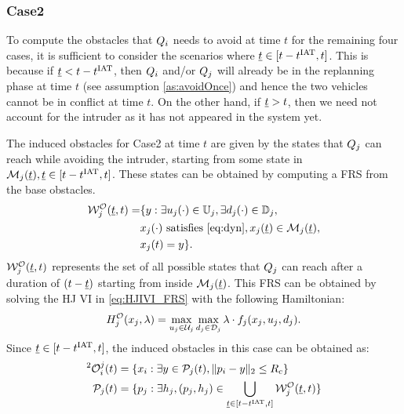 \subsubsection{Case2} \label{sec:intruderObs_case2}
To compute the obstacles that $Q_i$ needs to avoid at time $t$ for the remaining four cases, it is sufficient to consider the scenarios where $\underline{t} \in [t-t^\text{IAT}, t]$. This is because if $\underline{t} < t - t^\text{IAT}$, then $Q_i$ and/or $Q_j$ will already be in the replanning phase at time $t$ (see assumption \ref{as:avoidOnce}) and hence the two vehicles cannot be in conflict at time $t$. On the other hand, if $\underline{t} > t$, then we need not account for the intruder as it has not appeared in the system yet. %

The induced obstacles for Case2 at time $t$ are given by the states that $Q_j$ can reach while avoiding the intruder, starting from some state in $\mathcal{M}_j(\underline{t}), \underline{t} \in [t-t^\text{IAT}, t]$. These states can be obtained by computing a FRS from the base obstacles.
\begin{equation} \label{eq:ObsFRS_case2}
\begin{aligned}
\frs_{j}^{\mathcal{O}}(\tsa, t) = & \{y: \exists \ctrl_j(\cdot) \in \cfset_j, \exists \dstb_j(\cdot) \in \dfset_j, \\
& \state_j(\cdot) \text{ satisfies \eqref{eq:dyn}}, \state_j(\tsa) \in \boset_j(\tsa), \\
& \state_j(t) = y\}.
\end{aligned}
\end{equation}
$\mathcal{W}_{j}^{\mathcal{O}}(\underline{t}, t)$ represents the set of all possible states that $Q_j$ can reach after a duration of $(t-\underline{t})$ starting from inside $\mathcal{M}_j(\underline{t})$. This FRS can be obtained by solving the HJ VI in \eqref{eq:HJIVI_FRS} with the following Hamiltonian:
\begin{equation}
H_{j}^{\mathcal{O}}(x_j, \lambda) = \max_{u_j \in \mathcal{U}_j} \max_{d_j \in \mathcal{D}_j} \lambda \cdot f_j (x_j, u_j, d_j).
\end{equation} 
Since $\underline{t} \in [t-t^\text{IAT}, t]$, the induced obstacles in this case can be obtained as:
\begin{equation} \label{eq:intruderObs_case2} 
\begin{aligned}
^2\ioset_i^j(t) & = \{\state_i: \exists y \in \pfrs_j(t), \|\pos_i - y\|_2 \le \rc \}\\
\pfrs_j(t) & = \{p_j: \exists \npos_j, (p_j, \npos_j) \in \bigcup_{\tsa \in [t-\iat, t]} \frs_{j}^{\mathcal{O}}(\tsa, t) \}
\end{aligned}
\end{equation}

